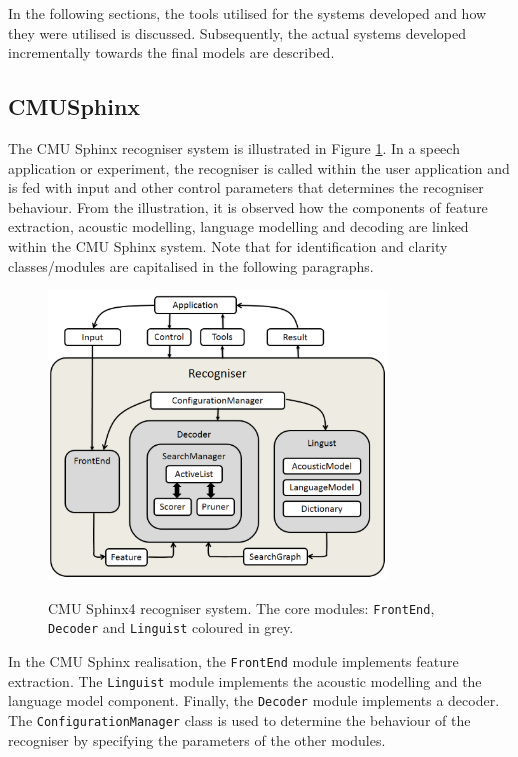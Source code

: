 In the following sections, the tools utilised for the systems developed and how they were utilised is discussed.  Subsequently, the actual systems developed incrementally towards the final models are described.

\subsection{CMUSphinx}
The CMU Sphinx recogniser system is illustrated in Figure \ref{fig_c3_sphinx}.  In a speech application or experiment, the recogniser is called within the user application and is fed with input and other control parameters that determines the recogniser behaviour.  From the illustration, it is observed how the components of feature extraction, acoustic modelling, language modelling and decoding are linked within the CMU Sphinx system.  Note that for identification and clarity classes/modules are capitalised in the following paragraphs.

\begin{figure}
\centering
  \includegraphics[width=9cm]{thesis/images/sphinx}\\
  \caption{CMU Sphinx4 recogniser system. The core modules: \texttt{FrontEnd}, \texttt{Decoder} and \texttt{Linguist} coloured in grey.}\label{fig_c3_sphinx}
\end{figure}
In the CMU Sphinx realisation, the \texttt{FrontEnd} module implements feature extraction.  The \texttt{Linguist} module implements the acoustic modelling and the language model component. Finally, the \texttt{Decoder} module implements a decoder.  The \texttt{ConfigurationManager} class is used to determine the behaviour of the recogniser by specifying the parameters of the other modules.   

